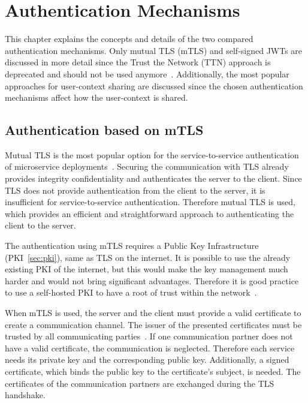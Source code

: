 \chapter{Authentication Mechanisms}
\label{cha:authentication_mechanisms}
This chapter explains the concepts and details of the two compared authentication mechanisms.
Only mutual TLS (mTLS) and self-signed JWTs are discussed in more detail since the Trust the Network (TTN) approach is deprecated and should not be used anymore~\cite{dias2020microservices}.
Additionally, the most popular approaches for user-context sharing are discussed since the chosen authentication mechanisms affect how the user-context is shared.


\section{Authentication based on mTLS}
Mutual TLS is the most popular option for the service-to-service authentication of microservice deployments~\cite{dias2020microservices}.
Securing the communication with TLS already provides integrity confidentiality and authenticates the server to the client.
Since TLS does not provide authentication from the client to the server, it is insufficient for service-to-service authentication.
Therefore mutual TLS is used, which provides an efficient and straightforward approach to authenticating the client to the server.

The authentication using mTLS requires a Public Key Infrastructure (PKI~\ref{sec:pki}), same as TLS on the internet.
It is possible to use the already existing PKI of the internet, but this would make the key management much harder and would not bring significant advantages.
Therefore it is good practice to use a self-hosted PKI to have a root of trust within the network~\cite{dias2020microservices}.

When mTLS is used, the server and the client must provide a valid certificate to create a communication channel.
The issuer of the presented certificates must be trusted by all communicating parties~\cite{dias2020microservices}.
If one communication partner does not have a valid certificate, the communication is neglected.
Therefore each service needs its private key and the corresponding public key.
Additionally, a signed certificate, which binds the public key to the certificate's subject, is needed.
The certificates of the communication partners are exchanged during the TLS handshake.

